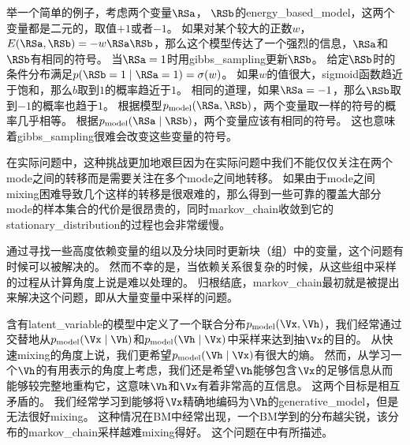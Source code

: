 举一个简单的例子，考虑两个变量$\RSa$， $\RSb$的\gls{energy_based_model}，这两个变量都是二元的，取值$+1$或者$-1$。
如果对某个较大的正数$w$， $E(\RSa,\RSb) = - w \RSa \RSb$，那么这个模型传达了一个强烈的信息，$\RSa$和$\RSb$有相同的符号。
当$\RSa=1$时用\gls{gibbs_sampling}更新$\RSb$。
给定$\RSb$时的条件分布满足$p(\RSb=1\mid \RSa=1) = \sigma(w)$。
如果$w$的值很大，\gls{sigmoid}函数趋近于饱和，那么$b$取到$1$的概率趋近于$1$。
相同的道理，如果$\RSa=-1$，那么$\RSb$取到$-1$的概率也趋于$1$。
根据模型$p_{\text{model}}(\RSa,\RSb)$，两个变量取一样的符号的概率几乎相等。
根据$p_{\text{model}}(\RSa\mid \RSb)$，两个变量应该有相同的符号。
这也意味着\gls{gibbs_sampling}很难会改变这些变量的符号。

在实际问题中，这种挑战更加地艰巨因为在实际问题中我们不能仅仅关注在两个\gls{mode}之间的转移而是需要关注在多个\gls{mode}之间地转移。
如果由于\gls{mode}之间\gls{mixing}困难导致几个这样的转移是很艰难的，那么得到一些可靠的覆盖大部分\gls{mode}的样本集合的代价是很昂贵的，同时\gls{markov_chain}收敛到它的\gls{stationary_distribution}的过程也会非常缓慢。

通过寻找一些高度依赖变量的组以及分块同时更新块（组）中的变量，这个问题有时候可以被解决的。
然而不幸的是，当依赖关系很复杂的时候，从这些组中采样的过程从计算角度上说是难以处理的。
归根结底，\gls{markov_chain}最初就是被提出来解决这个问题，即从大量变量中采样的问题。

含有\gls{latent_variable}的模型中定义了一个联合分布$p_{\text{model}}(\Vx,\Vh)$，我们经常通过交替地从$p_{\text{model}}(\Vx\mid \Vh)$和$p_{\text{model}}(\Vh\mid \Vx)$中采样来达到抽$\Vx$的目的。
从快速\gls{mixing}的角度上说，我们更希望$p_{\text{model}}(\Vh\mid \Vx)$有很大的熵。
然而，从学习一个$\Vh$的有用表示的角度上考虑，我们还是希望$\Vh$能够包含$\Vx$的足够信息从而能够较完整地重构它，这意味$\Vh$和$\Vx$有着非常高的互信息。
这两个目标是相互矛盾的。
我们经常学习到能够将$\Vx$精确地编码为$\Vh$的\gls{generative_model}，但是无法很好\gls{mixing}。
这种情况在\gls{BM}中经常出现，一个\gls{BM}学到的分布越尖锐，该分布的\gls{markov_chain}采样越难\gls{mixing}得好。
这个问题在中有所描述。


